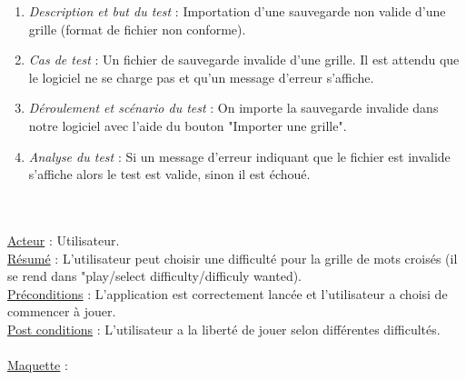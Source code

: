 \documentclass [ 11 pt ] {article}
\begin{document}
        \begin{tcolorbox}[colback=negatifC]
            \begin{enumerate}
                \item \textit{Description et but du test }: Importation d'une sauvegarde non valide d'une grille (format de fichier non conforme). 
                
                \item \textit{Cas de test }: Un fichier de sauvegarde invalide d'une grille. Il est attendu que le logiciel ne se charge pas et qu'un message d'erreur s'affiche.
                
                \item \textit{Déroulement et scénario du test }: On importe la sauvegarde invalide dans notre logiciel avec l'aide du bouton "Importer une grille".
                
                \item \textit{Analyse du test }: Si un message d'erreur indiquant que le fichier est invalide s'affiche alors le test est valide, sinon il est échoué.
            \end{enumerate}
        \end{tcolorbox}


\newpage
{} \\ \\ %
\underline {Acteur} : Utilisateur. \\
\underline {Résumé} : L'utilisateur peut choisir une difficulté pour la grille de mots croisés (il se rend dans "play/select difficulty/difficuly wanted). \\
\underline {Préconditions} : L'application est correctement lancée et l'utilisateur a choisi de commencer à jouer. \\
\underline {Post conditions} : L'utilisateur a la liberté de jouer selon différentes difficultés. \\\\
\underline {Maquette} : \\%
\end{document}
